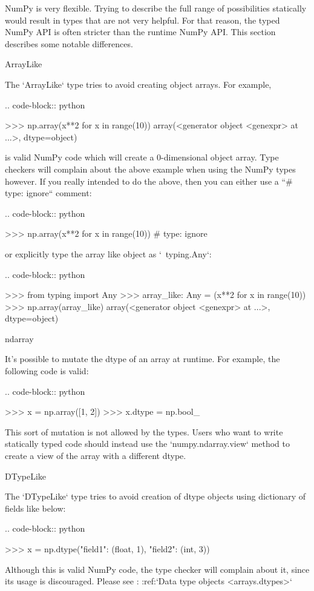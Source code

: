 \begin{DoxyVerb}
NumPy is very flexible. Trying to describe the full range of
possibilities statically would result in types that are not very
helpful. For that reason, the typed NumPy API is often stricter than
the runtime NumPy API. This section describes some notable
differences.

ArrayLike
~~~~~~~~~

The `ArrayLike` type tries to avoid creating object arrays. For
example,

.. code-block:: python

    >>> np.array(x**2 for x in range(10))
    array(<generator object <genexpr> at ...>, dtype=object)

is valid NumPy code which will create a 0-dimensional object
array. Type checkers will complain about the above example when using
the NumPy types however. If you really intended to do the above, then
you can either use a ``# type: ignore`` comment:

.. code-block:: python

    >>> np.array(x**2 for x in range(10))  # type: ignore

or explicitly type the array like object as `~typing.Any`:

.. code-block:: python

    >>> from typing import Any
    >>> array_like: Any = (x**2 for x in range(10))
    >>> np.array(array_like)
    array(<generator object <genexpr> at ...>, dtype=object)

ndarray
~~~~~~~

It's possible to mutate the dtype of an array at runtime. For example,
the following code is valid:

.. code-block:: python

    >>> x = np.array([1, 2])
    >>> x.dtype = np.bool_

This sort of mutation is not allowed by the types. Users who want to
write statically typed code should instead use the `numpy.ndarray.view`
method to create a view of the array with a different dtype.

DTypeLike
~~~~~~~~~

The `DTypeLike` type tries to avoid creation of dtype objects using
dictionary of fields like below:

.. code-block:: python

    >>> x = np.dtype({"field1": (float, 1), "field2": (int, 3)})

Although this is valid NumPy code, the type checker will complain about it,
since its usage is discouraged.
Please see : :ref:`Data type objects <arrays.dtypes>`


\end{DoxyVerb}
